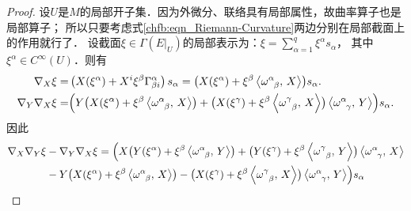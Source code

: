 \begin{proof}
设$U$是$M$的局部开子集．因为外微分、联络具有局部属性，故曲率算子也是局部算子；
所以只要考虑式\eqref{chfb:eqn_Riemann-Curvature}两边分别在局部截面上的作用就行了．
设截面$\xi \in \Gamma(E|_U)$的局部表示为：$\xi =\sum_{\alpha=1}^q \xi^\alpha s_\alpha$，
其中$\xi^\alpha \in C^\infty(U)$．则有
\begin{align*}
    \nabla_X \xi= & \left(X (\xi^\alpha )+ X^i \xi^\beta \Gamma_{\beta i}^\alpha \right) s_\alpha
    = \bigl(X (\xi^\alpha )+ \xi^\beta \left< \omega_{\hphantom{\alpha}\beta}^\alpha,\, X \right> \bigr) s_\alpha . \\
    \nabla_Y \nabla_X \xi= & \Bigl( 
    Y \bigl(X (\xi^\alpha )+ \xi^\beta \left< \omega_{\hphantom{\alpha}\beta}^\alpha,\, X \right> \bigr)+ 
    \bigl(X (\xi^\gamma )+ \xi^\beta \left< \omega_{\hphantom{\alpha}\beta}^\gamma,\, X \right> \bigr)
    \left< \omega_{\hphantom{\alpha}\gamma}^\alpha,\, Y \right> 
    \Bigr) s_\alpha .
\end{align*}
因此
\begin{align*}
    \nabla_X \nabla_Y \xi & -\nabla_Y \nabla_X \xi =
    \Bigl(      
     X \bigl(Y (\xi^\alpha )+ \xi^\beta \left< \omega_{\hphantom{\alpha}\beta}^\alpha,\, Y \right> \bigr)+ 
     \bigl(Y (\xi^\gamma )+ \xi^\beta \left< \omega_{\hphantom{\alpha}\beta}^\gamma,\, Y \right> \bigr)
     \left< \omega_{\hphantom{\alpha}\gamma}^\alpha,\, X \right> \\
    &-Y \bigl(X (\xi^\alpha )+ \xi^\beta \left< \omega_{\hphantom{\alpha}\beta}^\alpha,\, X \right> \bigr)-
    \bigl(X (\xi^\gamma )+ \xi^\beta \left< \omega_{\hphantom{\alpha}\beta}^\gamma,\, X \right> \bigr)
    \left< \omega_{\hphantom{\alpha}\gamma}^\alpha,\, Y \right>     \Bigr)s_\alpha \\

\end{align*}
\end{proof}
